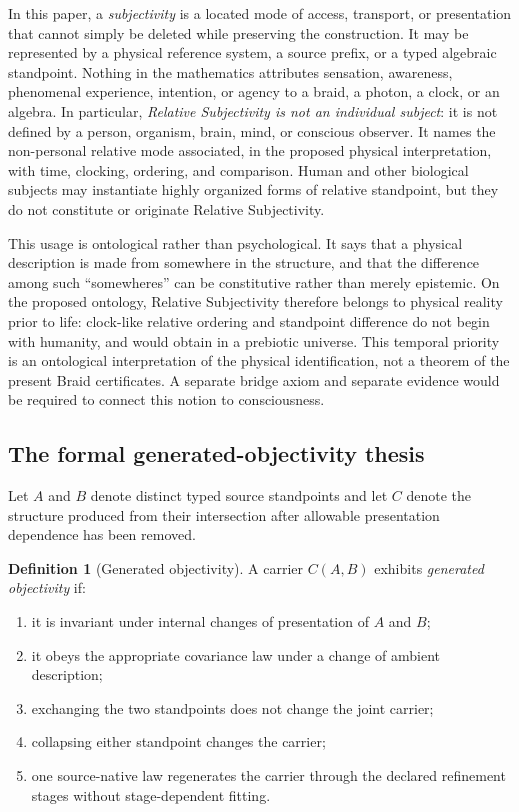 \documentclass[11pt]{article}
\theoremstyle{definition}
\newtheorem{definition}[theorem]{Definition}
\theoremstyle{remark}
\begin{document}
In this paper, a \emph{subjectivity} is a located mode of access, transport, or presentation that cannot simply be deleted while preserving the construction. It may be represented by a physical reference system, a source prefix, or a typed algebraic standpoint. Nothing in the mathematics attributes sensation, awareness, phenomenal experience, intention, or agency to a braid, a photon, a clock, or an algebra. In particular, \emph{Relative Subjectivity is not an individual subject}: it is not defined by a person, organism, brain, mind, or conscious observer. It names the non-personal relative mode associated, in the proposed physical interpretation, with time, clocking, ordering, and comparison. Human and other biological subjects may instantiate highly organized forms of relative standpoint, but they do not constitute or originate Relative Subjectivity.

This usage is ontological rather than psychological. It says that a physical description is made from somewhere in the structure, and that the difference among such ``somewheres'' can be constitutive rather than merely epistemic. On the proposed ontology, Relative Subjectivity therefore belongs to physical reality prior to life: clock-like relative ordering and standpoint difference do not begin with humanity, and would obtain in a prebiotic universe. This temporal priority is an ontological interpretation of the physical identification, not a theorem of the present Braid certificates. A separate bridge axiom and separate evidence would be required to connect this notion to consciousness.

\subsection{The formal generated-objectivity thesis}

Let $A$ and $B$ denote distinct typed source standpoints and let $C$ denote the structure produced from their intersection after allowable presentation dependence has been removed.

\begin{definition}[Generated objectivity]\label{def:go}
A carrier $C(A,B)$ exhibits \emph{generated objectivity} if:
\begin{enumerate}
\item it is invariant under internal changes of presentation of $A$ and $B$;
\item it obeys the appropriate covariance law under a change of ambient description;
\item exchanging the two standpoints does not change the joint carrier;
\item collapsing either standpoint changes the carrier;
\item one source-native law regenerates the carrier through the declared refinement stages without stage-dependent fitting.
\end{enumerate}
\end{definition}
\end{document}
